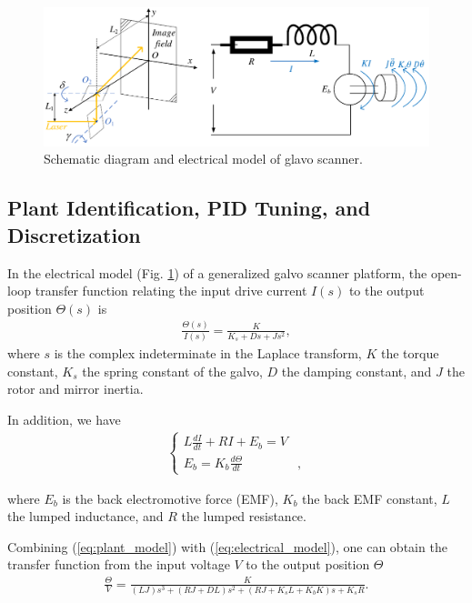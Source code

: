 \documentclass [11pt, proquest] {uwthesis}[2020/02/24]
\begin{document}
\begin{figure}[!ht]
\begin{centering}
\includegraphics[width=13cm]{Loop-shaping/Drawing1}
\par\end{centering}
\caption{\label{fig:Schematic-diagram-of-G}Schematic diagram and electrical
model of glavo scanner.}
\end{figure}

\subsection{Plant Identification, PID Tuning, and Discretization}

In the electrical model (Fig. \ref{fig:Schematic-diagram-of-G}) of
a generalized galvo scanner platform, the open-loop transfer function
\cite{keane1994full,mirtchev2010optimizing} relating the input drive
current $I(s)$ to the output position $\varTheta(s)$ is
\begin{gather}
\frac{\varTheta(s)}{I(s)}=\frac{K}{K_{s}+Ds+Js^{2}},\label{eq:plant_model}
\end{gather}
where $s$ is the complex indeterminate in the Laplace transform, $K$ the torque constant, $K_{s}$ the spring constant
of the galvo, $D$ the damping constant, and $J$ the rotor
and mirror inertia.

In addition, we have
\begin{gather}
\begin{cases}
L\frac{dI}{dt}+RI+E_{b}=V\\
E_{b}=K_{b}\frac{d\varTheta}{dt} & ,
\end{cases}\label{eq:electrical_model}
\end{gather}

\noindent where $E_{b}$ is the back electromotive force (EMF), $K_{b}$
the back EMF constant, $L$ the lumped inductance, and $R$ the lumped resistance.

Combining (\ref{eq:plant_model}) with (\ref{eq:electrical_model}),
one can obtain the transfer function from the input voltage $V$ to
the output position $\varTheta$
\begin{gather}
\frac{\varTheta}{V}=\frac{K}{(LJ)s^{3}+(RJ+DL)s^{2}+(RJ+K_{s}L+K_{b}K)s+K_{s}R}.\label{eq:trans_func_Vtheta}
\end{gather}
\end{document}

